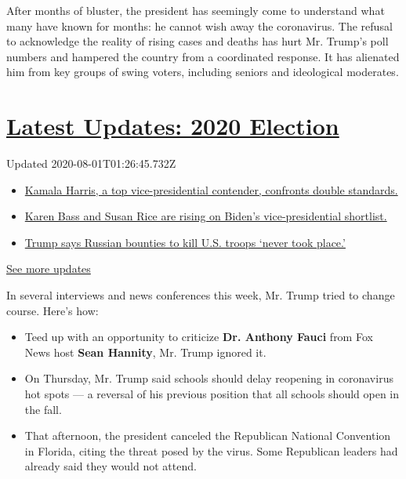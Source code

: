 After months of bluster, the president has seemingly come to understand
what many have known for months: he cannot wish away the coronavirus.
The refusal to acknowledge the reality of rising cases and deaths has
hurt Mr. Trump's poll numbers and hampered the country from a
coordinated response. It has alienated him from key groups of swing
voters, including seniors and ideological moderates.

\hypertarget{latest-updates-2020-election}{%
\section{\texorpdfstring{\href{https://www.nytimes.com/2020/07/31/us/elections/biden-vs-trump.html?action=click\&pgtype=Article\&state=default\&region=MAIN_CONTENT_1\&context=storylines_live_updates}{Latest
Updates: 2020
Election}}{Latest Updates: 2020 Election}}\label{latest-updates-2020-election}}

Updated 2020-08-01T01:26:45.732Z

\begin{itemize}
\tightlist
\item
  \href{https://www.nytimes.com/2020/07/31/us/elections/biden-vs-trump.html?action=click\&pgtype=Article\&state=default\&region=MAIN_CONTENT_1\&context=storylines_live_updates\#link-29fdff45}{Kamala
  Harris, a top vice-presidential contender, confronts double
  standards.}
\item
  \href{https://www.nytimes.com/2020/07/31/us/elections/biden-vs-trump.html?action=click\&pgtype=Article\&state=default\&region=MAIN_CONTENT_1\&context=storylines_live_updates\#link-13ec3d9c}{Karen
  Bass and Susan Rice are rising on Biden's vice-presidential
  shortlist.}
\item
  \href{https://www.nytimes.com/2020/07/31/us/elections/biden-vs-trump.html?action=click\&pgtype=Article\&state=default\&region=MAIN_CONTENT_1\&context=storylines_live_updates\#link-49e9a016}{Trump
  says Russian bounties to kill U.S. troops `never took place.'}
\end{itemize}

\href{https://www.nytimes.com/2020/07/31/us/elections/biden-vs-trump.html?action=click\&pgtype=Article\&state=default\&region=MAIN_CONTENT_1\&context=storylines_live_updates}{See
more updates}

In several interviews and news conferences this week, Mr. Trump tried to
change course. Here's how:

\begin{itemize}
\item
  Teed up with an opportunity to criticize \textbf{Dr. Anthony Fauci}
  from Fox News host \textbf{Sean Hannity}, Mr. Trump ignored it.
\item
  On Thursday, Mr. Trump said schools should delay reopening in
  coronavirus hot spots --- a reversal of his previous position that all
  schools should open in the fall.
\item
  That afternoon, the president canceled the Republican National
  Convention in Florida, citing the threat posed by the virus. Some
  Republican leaders had already said they would not attend.
\end{itemize}


